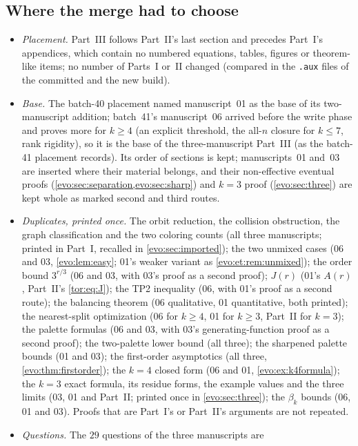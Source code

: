 \documentclass[11pt,a4paper]{article}
\numberwithin{equation}{section}
\theoremstyle{definition}
\theoremstyle{remark}
\begin{document}
\subsection{Where the merge had to choose}\label{evo:sec:merge}
\begin{itemize}
\item \emph{Placement.} Part~III follows Part~II's last section and precedes
 Part~I's appendices, which contain no numbered equations, tables, figures
 or theorem-like items; no number of Parts~I or~II changed (compared in the
 \texttt{.aux} files of the committed and the new build).
\item \emph{Base.} The batch-40 placement named manuscript~01 as the base of
 its two-manuscript addition; batch~41's manuscript~06 arrived before the
 write phase and proves more for $k\ge4$ (an explicit threshold, the all-$n$
 closure for $k\le7$, rank rigidity), so it is the base of the
 three-manuscript Part~III (as the batch-41 placement records). Its order of
 sections is kept; manuscripts~01 and~03 are inserted where their material
 belongs, and their non-effective eventual proofs
 (\cref{evo:sec:separation,evo:sec:sharp}) and $k=3$ proof
 (\cref{evo:sec:three}) are kept whole as marked second and third routes.
\item \emph{Duplicates, printed once.} The orbit reduction, the collision
 obstruction, the graph classification and the two coloring counts (all
 three manuscripts; printed in Part~I, recalled in
 \cref{evo:sec:imported}); the two unmixed cases (06 and 03,
 \cref{evo:lem:easy}; 01's weaker variant as \cref{evo:et:rem:unmixed});
 the order bound $3^{r/3}$ (06 and 03, with 03's proof as a second proof);
 $J(r)$ (01's $A(r)$, Part~II's \eqref{tor:eq:J}); the TP2 inequality (06,
 with 01's proof as a second route); the balancing theorem (06 qualitative,
 01 quantitative, both printed); the nearest-split optimization (06 for
 $k\ge4$, 01 for $k\ge3$, Part~II for $k=3$); the palette formulas (06 and
 03, with 03's generating-function proof as a second proof); the two-palette
 lower bound (all three); the sharpened palette bounds (01 and 03); the
 first-order asymptotics (all three, \cref{evo:thm:firstorder}); the $k=4$
 closed form (06 and 01, \cref{evo:ex:k4formula}); the $k=3$ exact formula,
 its residue forms, the example values and the three limits (03, 01 and
 Part~II; printed once in \cref{evo:sec:three}); the $\beta_k$ bounds (06,
 01 and 03). Proofs that are Part~I's or Part~II's arguments are not
 repeated.
\item \emph{Questions.} The $29$ questions of the three manuscripts are

\end{itemize}
\end{document}
